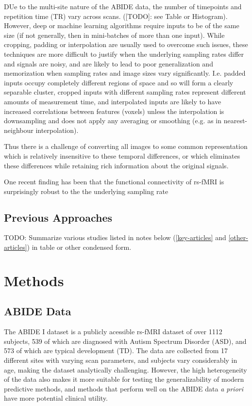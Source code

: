 \documentclass[10pt]{article}
\begin{document}
DUe to the multi-site nature of the ABIDE data, the number of timepoints and repetition time (TR)
vary across scans. ([TODO]: see Table or Histogram). However, deep or machine learning algorithms
require inputs to be of the same size (if not generally, then in mini-batches of more than one
input). While cropping, padding or interpolation are usually used to overcome such issues, these
techniques are more difficult to justify when the underlying sampling rates differ and signals are
noisy, and are likely to lead to poor generalization and memorization when sampling rates and image
sizes vary significantly. I.e. padded inputs occupy completely different regions of space and so
will form a clearly separable cluster, cropped inputs with different sampling rates represent
different amounts of measurement time, and interpolated inputs are likely to have increased
correlations between features (voxels) unless the interpolation is downsampling and does not apply
any averaging or smoothing (e.g. as in nearest-neighbour interpolation).

Thus there is a challenge of converting all images to some common representation which is relatively
insensitive to these temporal differences, or which eliminates these differences while retaining
rich information about the original signals.

One recent finding has been that the functional connectivity of rs-fMRI is surprisingly robust to the
the underlying sampling rate \citep{huotariSamplingRateEffects2019,shakilEvaluationSlidingWindow2016}

\subsection{Previous Approaches}

TODO: Summarize various studies listed in notes below (\ref{key-articles} and \ref{other-articles})
in table or other condensed form.



\section{Methods}

\subsection{ABIDE Data}

The ABIDE I dataset \citep{dimartinoAutismBrainImaging2014} is a publicly acessible rs-fMRI dataset of over
1112 subjects, 539 of which are diagnosed with Autism Spectrum Disorder (ASD),
and 573 of which are typical development (TD). The data are collected from 17 different sites with
varying scan parameters, and subjects vary considerably in age, making the dataset analytically
challenging. However, the high heterogeneity of the data also makes it more suitable for testing the
generalizability of modern predictive methods, and methods that perform well on the ABIDE data
\emph{a priori} have more potential clinical utility.
\end{document}
